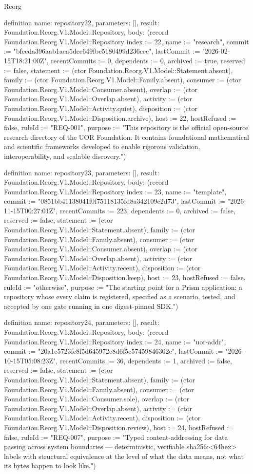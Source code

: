 \begin{lexlean}{Reorg}
\begin{semanticmodule}
definition{
  name: repository22,
  parameters: [],
  result: Foundation.Reorg.V1.Model::Repository,
  body: (record Foundation.Reorg.V1.Model::Repository {index := 22, name := "research", commit := "bfccda396aab1aea5dee649fbe5180499d236cec", lastCommit := "2026-02-15T18:21:00Z", recentCommits := 0, dependents := 0, archived := true, reserved := false, statement := (ctor Foundation.Reorg.V1.Model::Statement.absent), family := (ctor Foundation.Reorg.V1.Model::Family.absent), consumer := (ctor Foundation.Reorg.V1.Model::Consumer.absent), overlap := (ctor Foundation.Reorg.V1.Model::Overlap.absent), activity := (ctor Foundation.Reorg.V1.Model::Activity.quiet), disposition := (ctor Foundation.Reorg.V1.Model::Disposition.archive), host := 22, hostRefused := false, ruleId := "REQ-001", purpose := "This repository is the official open-source research directory of the UOR Foundation. It contains foundational mathematical and scientific frameworks developed to enable rigorous validation, interoperability, and scalable discovery."})
}

definition{
  name: repository23,
  parameters: [],
  result: Foundation.Reorg.V1.Model::Repository,
  body: (record Foundation.Reorg.V1.Model::Repository {index := 23, name := "template", commit := "0851bb41138041f0f75118135fd8a342109c2d73", lastCommit := "2026-11-15T00:27:01Z", recentCommits := 223, dependents := 0, archived := false, reserved := false, statement := (ctor Foundation.Reorg.V1.Model::Statement.absent), family := (ctor Foundation.Reorg.V1.Model::Family.absent), consumer := (ctor Foundation.Reorg.V1.Model::Consumer.absent), overlap := (ctor Foundation.Reorg.V1.Model::Overlap.absent), activity := (ctor Foundation.Reorg.V1.Model::Activity.recent), disposition := (ctor Foundation.Reorg.V1.Model::Disposition.keep), host := 23, hostRefused := false, ruleId := "otherwise", purpose := "The starting point for a Prism application: a repository whose every claim is registered, specified as a scenario, tested, and accepted by one gate running in one digest-pinned SDK."})
}

definition{
  name: repository24,
  parameters: [],
  result: Foundation.Reorg.V1.Model::Repository,
  body: (record Foundation.Reorg.V1.Model::Repository {index := 24, name := "uor-addr", commit := "20a1c5723fc8f5d645972c8d6f5c57459846302e", lastCommit := "2026-10-15T05:08:23Z", recentCommits := 36, dependents := 1, archived := false, reserved := false, statement := (ctor Foundation.Reorg.V1.Model::Statement.absent), family := (ctor Foundation.Reorg.V1.Model::Family.absent), consumer := (ctor Foundation.Reorg.V1.Model::Consumer.sole), overlap := (ctor Foundation.Reorg.V1.Model::Overlap.absent), activity := (ctor Foundation.Reorg.V1.Model::Activity.recent), disposition := (ctor Foundation.Reorg.V1.Model::Disposition.review), host := 24, hostRefused := false, ruleId := "REQ-007", purpose := "Typed content-addressing for data passing across system boundaries — deterministic, verifiable sha256:<64hex> labels with structural equivalence at the level of what the data means, not what its bytes happen to look like."})
}


\end{semanticmodule}
\end{lexlean}
